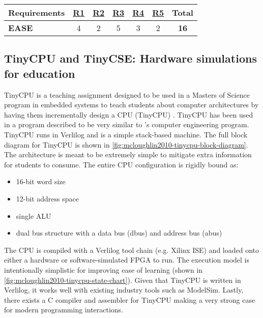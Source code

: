 \begin{table}[h!]
    \centering
    \begin{tabular}{lcccccc}
        \textbf{Requirements} & \textbf{\hyperref[req:personal]{R1}} & \textbf{\hyperref[req:configuration]{R2}} & \textbf{\hyperref[req:pedagogical]{R3}} & \textbf{\hyperref[req:simulations]{R4}} & \textbf{\hyperref[req:modern]{R5}} & \textbf{Total} \\ \hline
        \textbf{EASE \cite{Skillen2011}}
        & 4 & 2 & 5 & 3 & 2 & \textbf{16} \\
    \end{tabular}
\end{table}

\subsection{TinyCPU and TinyCSE: Hardware simulations for education}
\label{sec:review-tiny-cse}

TinyCPU is a teaching assignment designed to be used in a Masters of Science program in embedded systems to teach students about computer architectures by having them incrementally design a CPU (TinyCPU) \cite{McLoughlin2010}. TinyCPU has been used in a program described to be very similar to \uwo's computer engineering program. TinyCPU runs in Verlilog and is a simple stack-based machine. The full block diagram for TinyCPU is shown in \cref{fig:mcloughlin2010-tinycpu-block-diagram}. The architecture is meant to be extremely simple to mitigate extra information for students to consume. The entire CPU configuration is rigidly bound as:
\begin{itemize}
    \item 16-bit word size
    \item 12-bit address space
    \item single ALU
    \item dual bus structure with a data bus (dbus) and address bus (abus)
\end{itemize}
The CPU is compiled with a Verlilog tool chain (e.g. Xilinx ISE) and loaded onto either a hardware or software-simulated FPGA to run. The execution model is intentionally simplistic for improving ease of learning (shown in \cref{fig:mcloughlin2010-tinycpu-state-chart}). Given that TinyCPU is written in Verlilog, it works well with existing industry tools such as ModelSim. Lastly, there exists a C compiler and assembler for TinyCPU making a very strong case for modern programming interactions. 

